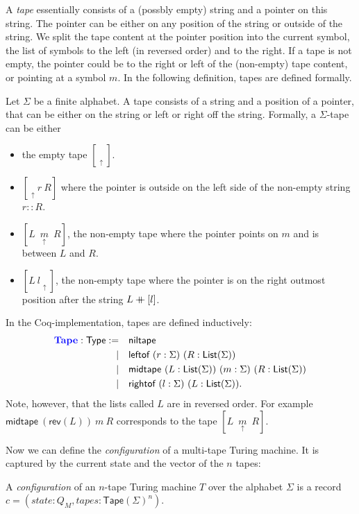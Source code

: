 \documentclass{psartcl}
\newcommand{\MS}[1]{\textsf{#1}}
\newcommand{\cons}{\mathbin{::}}
\newcommand{\rev}{\MS{rev}}
\newcommand\mdoubleplus{\ensuremath{\mathbin{+\mkern-10mu+}}}
\newcommand{\app}{\mdoubleplus}
\newcommand{\Type}{\MS{Type}}
\newcommand{\List}{\MS{List}}
\newcommand{\tape}[1]{[ #1 ]}
\newcommand{\tapePointer}[1]{\; \underset{\uparrow}{#1} \;}
\newcommand{\niltape}{\tape{\tapePointer{}}}
\newcommand{\midtape}[3]{\tape{#1 ~ \tapePointer{#2} ~ #3}}
\newcommand{\leftof}[2]{\tape{\tapePointer{} #1 ~ #2}}
\newcommand{\rightof}[2]{\tape{#1 ~ #2 \tapePointer{}}}
\newcommand{\Tape}{\MS{Tape}}
\begin{document}
A \emph{tape} essentially consists of a (possbly empty) string and a pointer on this string.  The pointer can be either on any position of the string
or outside of the string.  We split the tape content at the pointer position into the current symbol, the list of symbols to the left (in reversed
order) and to the right.  If a tape is not empty, the pointer could be to the right or left of the (non-empty) tape content, or pointing at a symbol
$m$.  In the following definition, tapes are defined formally.

\begin{definition}[Tape]
  \label{def:tape}
  Let $\Sigma$ be a finite alphabet.  A tape consists of a string and a position of a pointer, that can be either on the string or left or right off
  the string.  Formally, a $\Sigma$-tape can be either
  \begin{itemize}
    \item the empty tape $\niltape$.
    \item $\leftof{r}{R}$ where the pointer is outside on the left side of the non-empty string $r \cons R$.
    \item $\midtape{L}{m}{R}$, the non-empty tape where the pointer points on $m$ and is between $L$ and $R$.
    \item $\rightof{L}{l}$, the non-empty tape where the pointer is on the right outmost position after the string $L \app [l]$.
  \end{itemize}


  In the Coq-implementation, tapes are defined inductively:
  \begin{alignat*}{2}
    \emph{Tape}:\Type := \quad & \MS{niltape} \\
                       | \quad & \MS{leftof}  ~ (r:\Sigma) ~ (R:\List(\Sigma)) \\
                       | \quad & \MS{midtape} ~ (L:\List(\Sigma)) ~ (m:\Sigma) ~ (R:\List(\Sigma)) \\
                       | \quad & \MS{rightof} ~ (l:\Sigma) ~ (L:\List(\Sigma)).
  \end{alignat*}
  Note, however, that the lists called $L$ are in reversed order.  For example $\MS{midtape}~(\rev(L))~m~R$ corresponds to the tape
  $\midtape{L}{m}{R}$.
\end{definition}

Now we can define the \emph{configuration} of a multi-tape Turing machine.  It is captured by the current state and the vector of the $n$ tapes:
\begin{definition}[Configuration]
  \label{def:config}
  A \emph{configuration} of an $n$-tape Turing machine $T$ over the alphabet $\Sigma$ is a record $c=(state:Q_M, tapes:\Tape(\Sigma)^n)$.
\end{definition}
\end{document}
